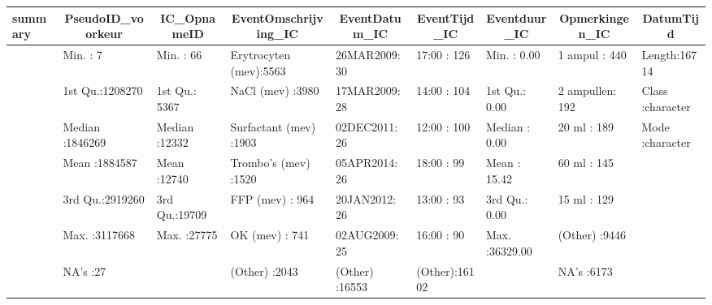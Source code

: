 \begin{table}[!tbp]
\begin{center}
\begin{tabular}{lllllllll}
\hline\hline
\multicolumn{1}{l}{summary}&\multicolumn{1}{c}{PseudoID_voorkeur}&\multicolumn{1}{c}{ IC_OpnameID}&\multicolumn{1}{c}{       EventOmschrijving_IC}&\multicolumn{1}{c}{  EventDatum_IC}&\multicolumn{1}{c}{ EventTijd_IC}&\multicolumn{1}{c}{ Eventduur_IC}&\multicolumn{1}{c}{   Opmerkingen_IC}&\multicolumn{1}{c}{ DatumTijd}\tabularnewline
\hline
&Min.   :      7  &Min.   :   66  &Erytrocyten (mev):5563  &26MAR2009:   30  &17:00  :  126  &Min.   :    0.00  &1 ampul   : 440  &Length:16714      \tabularnewline
&1st Qu.:1208270  &1st Qu.: 5367  &NaCl (mev)       :3980  &17MAR2009:   28  &14:00  :  104  &1st Qu.:    0.00  &2 ampullen: 192  &Class :character  \tabularnewline
&Median :1846269  &Median :12332  &Surfactant (mev) :1903  &02DEC2011:   26  &12:00  :  100  &Median :    0.00  &20 ml     : 189  &Mode  :character  \tabularnewline
&Mean   :1884587  &Mean   :12740  &Trombo's (mev)   :1520  &05APR2014:   26  &18:00  :   99  &Mean   :   15.42  &60 ml     : 145  &\tabularnewline
&3rd Qu.:2919260  &3rd Qu.:19709  &FFP (mev)        : 964  &20JAN2012:   26  &13:00  :   93  &3rd Qu.:    0.00  &15 ml     : 129  &\tabularnewline
&Max.   :3117668  &Max.   :27775  &OK (mev)         : 741  &02AUG2009:   25  &16:00  :   90  &Max.   :36329.00  &(Other)   :9446  &\tabularnewline
&NA's   :27  &&(Other)          :2043  &(Other)  :16553  &(Other):16102  &&NA's      :6173  &\tabularnewline
\hline
\end{tabular}\end{center}
\end{table}
